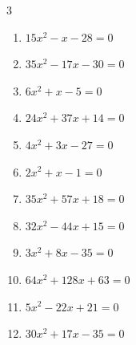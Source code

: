 \begin{multicols}{3}
\begin{enumerate}

  \item $15x^{2}-x-28=0$


  \item $35x^{2}-17x-30=0$


  \item $6x^{2}+x-5=0$


  \item $24x^{2}+37x+14=0$


  \item $4x^{2}+3x-27=0$


  \item $2x^{2}+x-1=0$


  \item $35x^{2}+57x+18=0$


  \item $32x^{2}-44x+15=0$


  \item $3x^{2}+8x-35=0$


\columnbreak %

  \item $64x^{2}+128x+63=0$


  \item $5x^{2}-22x+21=0$


  \item $30x^{2}+17x-35=0$



\end{enumerate}
\end{multicols}
